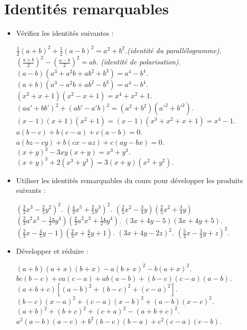 \chapter{Identités remarquables}


\begin{itemize}
\item Vérifiez les identités suivantes : 
\begin{itemize}
\it $\frac12(a+b)^2+\frac12(a-b)^2=a^2+b^2$.(identité du parallélogramme).
\it $\left(\frac{a+b}2\right)^2-\left(\frac{a-b}2\right)^2=ab$. (identité de polarisation). 
\it $(a-b)(a^3+a^2b+ab^2+b^3)=a^4-b^4$.
\it $(a+b)(a^3-a^2b+ab^2-b^3)=a^4-b^4$.
\it $(x^2+x+1)(x^2-x+1)= x^4+x^2+1$.
\it $(aa'+bb')^2+(ab'-a'b)^2=(a^2+b^2)(a'^2+b'^2)$.
\it $(x-1)(x+1)(x^2+1)=(x-1)(x^3+x^2+x+1)=x^4-1$.
\it $a(b-c)+b(c-a)+c(a-b)=0$.
\it $a(bz-cy)+b(cx-az)+c(ay-bx)=0$.
\it $(x+y)^3-3xy(x+y)=x^3+y^3$.
\it $(x+y)^3+2(x^3+y^3)=3(x+y)(x^2+y^2)$. 
\end{itemize}
\item Utiliser les identités remarquables du cours pour développer les produits suivants : 
\begin{itemize}
\it $\left(\frac32x^3-\frac25y^2\right)^2$.
\it $\left(\frac43x^5+\frac25y^3\right)^2$.
\it $\left(\frac25x^2-\frac34y\right)\left(\frac25x^2+\frac34y\right)$
\it $\left(\frac23a^2x^3-\frac12by^4\right)\left(\frac23a^2x^3+\frac12by^4\right)$.
\it $(3x+4y-5)(3x+4y+5)$.
\it $\left(\frac23x-\frac45y-1\right)\left(\frac23x+\frac45y+1\right)$.
\it $(3x+4y-2z)^2$. 
\it $\left(\frac52x-\frac34y+z\right)^2$. 
\end{itemize}
\item Développer et réduire : 
\begin{itemize}
\it $(a+b)(a+x)(b+x)-a(b+x)^2-b(a+x)^2$.
\it $bc(b-c)+ca(c-a)+ab(a-b)+(b-c)(c-a)(a-b)$.
\it $(a+b+c)[(a-b)^2+(b-c)^2+(c-a)^2]$.
\it $(b-c)(x-a)^2+(c-a)(x-b)^2+(a-b)(x-c)^2$.
\it $(a+b)^2+(b+c)^2+(c+a)^2-(a+b+c)^2$. 
\it $a^2(a-b)(a-c)+b^2(b-c)(b-a)+c^2(c-a)(c-b)$. 
\end{itemize}
\end{itemize}